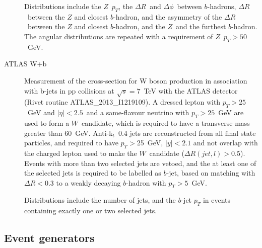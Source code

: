 \documentclass[11pt]{cernrep}
\newcommand{\pt}{\ensuremath{p_{T}}\xspace}
\begin{document}
\begin{description}
  Distributions include the $Z$\ \pt, the $\Delta R$\ and
  $\Delta\phi$\ between $b$-hadrons, $\Delta R$\ between the $Z$ and closest
  $b$-hadron, and the asymmetry of the $\Delta R$\ between the $Z$ and
  closest $b$-hadron, and the $Z$\ and the furthest $b$-hadron. The angular
  distributions are repeated with a requirement of $Z$\ $\pt>50$~GeV.

\item[ATLAS W+b] Measurement of the cross-section for W boson production in association
  with b-jets in pp collisions at $\sqrt{s} = 7$~TeV with the ATLAS
  detector~\cite{Aad:2013vka} (Rivet routine ATLAS\_2013\_I1219109). A
  dressed lepton with $\pt>25$~GeV and $|\eta|<2.5$\ and a same-flavour
  neutrino with $\pt>25$~GeV are used to form a $W$~candidate, which is
  required to have a transverse mass greater than $60$~GeV. Anti-k$_{t}$\ 0.4
  jets are reconstructed from all final state particles, and required to have
  $\pt>$25~GeV, $|y|<2.1$ and not overlap with the charged lepton used to
  make the $W$~candidate ($\Delta R(jet, l)> 0.5$). Events with more than two
  selected jets are vetoed, and the at least one of the selected jets is
  required to be labelled as $b$-jet, based on matching with $\Delta R<0.3$
  to a weakly decaying $b$-hadron with $\pt>5$~GeV.

  Distributions include the number of jets, and the $b$-jet \pt in events
  containing exactly one or two selected jets.


\end{description}

\subsection{Event generators \label{generators}}
\end{document}
